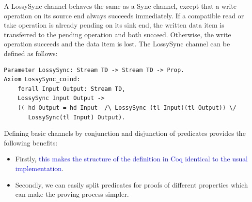 \documentclass[preprint,3p]{elsarticle}
\newcommand{\liyi}[1]{\textcolor{blue}{#1}}
\newcommand{\xy}[1]{{#1}}
\begin{document}
A LossySync channel behaves the same as a Sync channel, except that a write operation on its source end always succeeds immediately. If a compatible read or take operation is already pending on its sink end, the written data item is transferred to the pending operation and both succeed. Otherwise, the write operation succeeds and the data item is lost. The LossySync channel can be defined as follows:
\begin{lstlisting}[language=coq]
Parameter LossySync: Stream TD -> Stream TD -> Prop.
Axiom LossySync_coind:
    forall Input Output: Stream TD,
    LossySync Input Output ->
    (( hd Output = hd Input  /\ LossySync (tl Input)(tl Output)) \/
       LossySync(tl Input) Output).
\end{lstlisting}



\xy{Defining basic channels by conjunction and disjunction of predicates provides the following benefits:}
\begin{itemize}
\item Firstly, \liyi{this makes the structure of the definition in Coq identical to the usual implementation}.
\item Secondly, we can easily split predicates for proofs of different properties which can make the proving process simpler.
\end{itemize}
\end{document}
